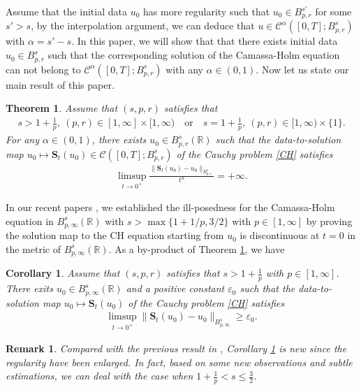 \documentclass[12pt]{article}
\newtheorem{theorem}{Theorem}[section]
\newtheorem{corollary}{Corollary}[section]
\newtheorem{remark}{Remark}[section]
\newcommand{\bal}{\begin{align}}
\newcommand{\bbal}{\begin{align*}}
\newcommand{\ep}{\varepsilon}
\newcommand{\R}{\mathbb{R}}
\begin{document}
Assume that  the initial data $u_0$ has more regularity such that $u_0\in B^{s'}_{p,r}$ for some $s'>s$, by the interpolation argument, we can deduce that $u\in \mathcal{C}^\alpha([0,T];B^s_{p,r})$ with $\alpha=s'-s$.
In this paper, we will show that that there exists
initial data $u_0\in B^s_{p,r}$ such that the corresponding solution of the Camassa-Holm equation can not belong to $\mathcal{C}^\alpha([0,T];B^s_{p,r})$ with any $\alpha\in(0,1)$. Now let us state our main result of this paper.
\begin{theorem}\label{th1}
Assume that $(s,p,r)$ satisfies that
\bal\label{cond}
s>1+\frac1p, \ (p,r)\in[1,\infty]\times[1,\infty) \quad\text{or}\quad s=1+\frac1p, \ (p,r)\in[1,\infty)\times \{1\}.
\end{align}
For any $\alpha\in(0,1)$, there exists $u_0\in B^s_{p,r}(\R)$  such that the data-to-solution map $u_0\mapsto \mathbf{S}_{t}(u_0)\in \mathcal{C}([0,T];B^s_{p,r})$ of the Cauchy problem \eqref{CH}
satisfies
\bbal
\limsup_{t\to0^+}\frac{\|\mathbf{S}_{t}(u_0)-u_0\|_{B^s_{p,r}}}{t^\alpha}=+\infty.
\end{align*}
\end{theorem}
In our recent papers \cite{jee}, we established the ill-posedness for the Camassa-Holm equation in $B^s_{p,\infty}(\mathbb{R})$ with $s>\max\big\{1+1/p, 3/2\big\}$ with $p\in[1,\infty]$ by proving the solution map to the CH equation starting from $u_0$ is discontinuous at $t = 0$ in the metric of $B^s_{p,\infty}(\mathbb{R})$. As a by-product of Theorem \ref{th1}, we have
\begin{corollary}\label{co1}
Assume that $(s,p,r)$ satisfies that
$s>1+\frac1p$ with $p\in[1,\infty]$.
There exits $u_0\in B^s_{p,\infty}(\R)$ and a positive constant $\ep_0$ such that the data-to-solution map $u_0\mapsto \mathbf{S}_{t}(u_0)$ of the Cauchy problem \eqref{CH}
satisfies
\bbal
\limsup_{t\to0^+}\|\mathbf{S}_{t}(u_0)-u_0\|_{B^s_{p,\infty}}\geq\ep_0.
\end{align*}
\end{corollary}
\begin{remark} Compared with the previous result in \cite{jee}, Corollary \ref{co1} is new since the regularity have been enlarged. In fact, based on some new observations and subtle estimations, we can deal with the case when $1+\frac{1}{p}<s\leq\frac{3}{2}$.
\end{remark}
\end{document}
